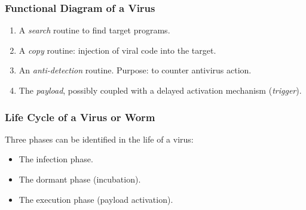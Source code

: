 \documentclass{beamer}
\newcommand{\enlight}[1]{\textit{\color{blue}#1}}
\begin{document}
\begin{frame}
\frametitle{Functional Diagram of a Virus}

\begin{enumerate}
\item A \enlight{search} routine to find target programs.
\medskip
\item A \enlight{copy} routine: injection of viral code into the target.
  \medskip
\item An \enlight{anti-detection} routine. Purpose: to counter antivirus action.
  \medskip
\item The \enlight{payload}, possibly coupled with a delayed activation mechanism (\enlight{trigger}).%
\end{enumerate}
\end{frame}


\begin{frame}
\frametitle{Life Cycle of a Virus or Worm}

Three phases can be identified in the life of a virus:
\begin{itemize}
\item The infection phase.
\item The dormant phase (incubation).
\item The execution phase (payload activation).
\end{itemize}

\end{frame}
\end{document}
